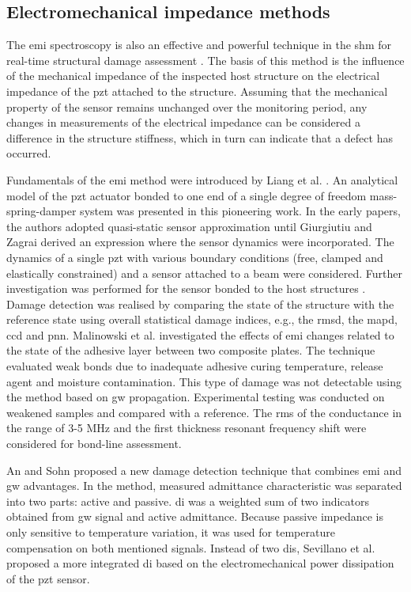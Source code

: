 \documentclass[11pt,a4paper,final]{report}
\theoremstyle{plain}
\begin{document}
\subsection{Electromechanical impedance methods}
The \ac{emi} spectroscopy is also an effective and powerful technique in the \ac{shm} for real-time structural damage assessment \cite{park2003overview}.
The basis of this method is the influence of the mechanical impedance of the inspected host structure on the electrical impedance of the \ac{pzt} attached to the structure.
Assuming that the mechanical property of the sensor remains unchanged over the monitoring period, any changes in measurements of the electrical impedance can be considered a difference in the structure stiffness, which in turn can indicate that a defect has occurred.

Fundamentals of the \ac{emi} method were introduced by Liang et al. \cite{liang1994impedance}.
An analytical model of the \ac{pzt} actuator bonded to one end of a single degree of freedom mass-spring-damper system was presented in this pioneering work.
In the early papers, the authors adopted quasi-static sensor approximation until  Giurgiutiu and Zagrai \cite{giurgiutiu2000characterization} derived an expression where the sensor dynamics were incorporated.
The dynamics of a single \ac{pzt} with various boundary conditions (free, clamped and elastically constrained) and a sensor attached to a beam were considered.
Further investigation was performed for the sensor bonded to the host structures \cite{zagrai2001electro, giurgiutiu2005damage}.
Damage detection was realised by comparing the state of the structure with the reference state using overall statistical damage indices, e.g., the \ac{rmsd}, the \ac{mapd}, \ac{ccd} and \ac{pnn}.
Malinowski et al. \cite{malinowski2014characterisation, malinowski2015use} investigated the effects of \ac{emi} changes related to the state of the adhesive layer between two composite plates.
The technique evaluated weak bonds due to inadequate adhesive curing temperature, release agent and moisture contamination.
This type of damage was not detectable using the method based on \ac{gw} propagation.
Experimental testing was conducted on weakened samples and compared with a reference.
The \ac{rms} of the conductance in the range of 3-5 MHz and the first thickness resonant frequency shift were considered for bond-line assessment.

An and Sohn \cite{an2012integrated} proposed a new damage detection technique that combines \ac{emi} and \ac{gw} advantages.
In the method, measured admittance characteristic was separated into two parts: active and passive.
\Ac{di} was a weighted sum of two indicators obtained from \ac{gw} signal and active admittance.
Because passive impedance is only sensitive to temperature variation, it was used for temperature compensation on both mentioned signals.
Instead of two \acp{di}, Sevillano et al. \cite{sevillano2016damage} proposed a more integrated \ac{di} based on the electromechanical power dissipation of the \ac{pzt} sensor.
\end{document}
